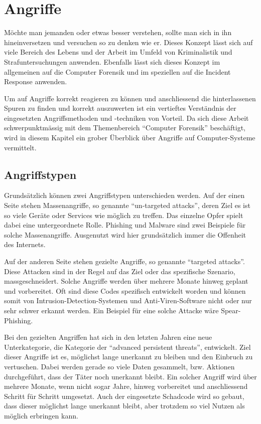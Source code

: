 \chapter{Angriffe} \label{chap:Attacks}

Möchte man jemanden oder etwas besser verstehen, sollte man sich in ihn hineinversetzen und versuchen so zu denken wie er. Dieses Konzept lässt sich auf viele Bereich des Lebens und der Arbeit im Umfeld von Kriminalistik und Strafuntersuchungen anwenden. Ebenfalls lässt sich dieses Konzept im allgemeinen auf die Computer Forensik und im speziellen auf die Incident Response anwenden.

Um auf Angriffe korrekt reagieren zu können und anschliessend die hinterlassenen Spuren zu finden und korrekt auszuwerten ist ein vertieftes Verständnis der eingesetzten Angriffsmethoden und -techniken von Vorteil. Da sich diese Arbeit schwerpunktmässig mit dem Themenbereich "`Computer Forensik"' beschäftigt, wird in diesem Kapitel ein grober Überblick über Angriffe auf Computer-Systeme vermittelt.

\section{Angriffstypen}
Grundsätzlich können zwei Angriffstypen unterschieden werden. Auf der einen Seite stehen Massenangriffe, so genannte "`un-targeted attacks"', deren Ziel es ist so viele Geräte oder Services wie möglich zu treffen. Das einzelne Opfer spielt dabei eine untergeordnete Rolle. Phishing und Malware sind zwei Beispiele für solche Massenangriffe. Ausgenutzt wird hier grundsätzlich immer die Offenheit des Internets.

Auf der anderen Seite stehen gezielte Angriffe, so genannte "`targeted attacks"'. Diese Attacken sind in der Regel auf das Ziel oder das spezifische Szenario, massgeschneidert. Solche Angriffe werden über mehrere Monate hinweg geplant und vorbereitet. Oft sind diese Codes spezifisch entwickelt worden und können somit von Intrusion-Detection-Systemen und Anti-Viren-Software nicht oder nur sehr schwer erkannt werden. Ein Beispiel für eine solche Attacke wäre Spear-Phishing. \footnotemark


Bei den gezielten Angriffen hat sich in den letzten Jahren eine neue Unterkategorie, die Kategorie der "`advanced persistent threats"', entwickelt. Ziel dieser Angriffe ist es, möglichst lange unerkannt zu bleiben und den Einbruch zu vertuschen. Dabei werden gerade so viele Daten gesammelt, bzw. Aktionen durchgeführt, dass der Täter noch unerkannt bleibt. Ein solcher Angriff wird über mehrere Monate, wenn nicht sogar Jahre, hinweg vorbereitet und anschliessend Schritt für Schritt umgesetzt. Auch der eingesetzte Schadcode wird so gebaut, dass dieser möglichst lange unerkannt bleibt, aber trotzdem so viel Nutzen als möglich erbringen kann.


